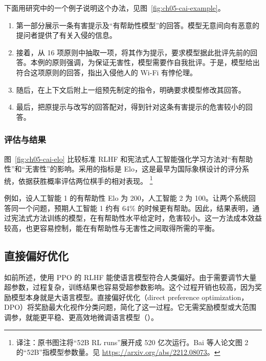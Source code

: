 下面用研究中的一个例子说明这个办法，见图~\ref{fig:ch05-cai-example}。

\begin{enumerate}[label=\alph*.]
\item 第一部分展示一条有害提示及“有帮助性模型”的回答。模型无意间向有恶意的提问者提供了有关入侵的信息。
\item 接着，从 16 项原则中抽取一项，将其作为提示，要求模型据此批评先前的回答。本例的原则强调，为保证无害性，模型需要作自我批评。于是，模型给出符合这项原则的回答，指出入侵他人的 Wi-Fi 有悖伦理。
\item 随后，在上下文后附上一组预先制定的指令，明确要求模型修改其回答。
\item 最后，把原提示与改写的回答配对，得到针对这条有害提示的危害较小的回答。
\end{enumerate}


\subsubsection{评估与结果}
图~\ref{fig:ch05-cai-elo} 比较标准 RLHF 和宪法式人工智能强化学习方法对“有帮助性”和“无害性”的影响。采用的指标是 Elo，这是最早为国际象棋设计的评分系统，依据获胜概率评估两位棋手的相对表现。%
\footnote{译注：原书图注将“52B RL runs”展开成 520 亿次运行。Bai 等人论文图 2 的“52B”指模型参数量。见 \url{https://arxiv.org/abs/2212.08073}。}


例如，设人工智能 1 的有帮助性 Elo 为 200，人工智能 2 为 100。让两个系统回答同一个问题，预期人工智能 1 约有 64\% 的时候更有帮助。因此，结果表明，通过宪法式方法训练的模型，在有帮助性水平给定时，危害较小。这一方法成本效益较高，也更容易控制，能在有帮助性与无害性之间取得所需的平衡。

\subsection{直接偏好优化}
\label{sec:ch05-dpo}
如前所述，使用 PPO 的 RLHF 能使语言模型符合人类偏好。由于需要调节大量超参数，过程复杂，训练结果也容易受超参数影响。这个过程开销也较高，因为奖励模型本身就是大语言模型。直接偏好优化（direct preference optimization，DPO）将奖励最大化视作分类问题，简化了这一过程。它无需奖励模型或大范围调参，就能更平稳、更高效地微调语言模型（）。

